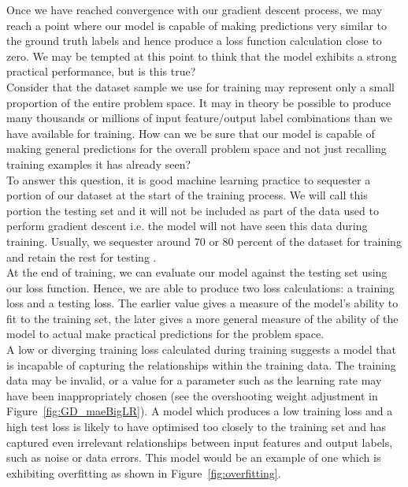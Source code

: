 \noindent
Once we have reached convergence with our gradient descent process, we may reach a point where our model is capable of making predictions very similar to the ground truth labels and hence produce a loss function calculation close to zero. We may be tempted at this point to think that the model exhibits a strong practical performance, but is this true? \\

\noindent
Consider that the dataset sample we use for training may represent only a small proportion of the entire problem space. It may in theory be possible to produce many thousands or millions of input feature/output label combinations than we have available for training. How can we be sure that our model is capable of making general predictions for the overall problem space and not just recalling training examples it has already seen? \\

\noindent
To answer this question, it is good machine learning practice to sequester a portion of our dataset at the start of the training process. We will call this portion the testing set and it will not be included as part of the data used to perform gradient descent i.e. the model will not have seen this data during training. Usually, we sequester around 70 or 80 percent of the dataset for training and retain the rest for testing \cite{gholamy201870}.\\

\noindent
At the end of training, we can evaluate our model against the testing set using our loss function. Hence, we are able to produce two loss calculations: a training loss and a testing loss. The earlier value gives a measure of the model's ability to fit to the training set, the later gives a more general measure of the ability of the model to actual make practical predictions for the problem space. \\

\noindent
A low or diverging training loss calculated during training suggests a model that is incapable of capturing the relationships within the training data. The training data may be invalid, or a value for a parameter such as the learning rate may have been inappropriately chosen (see the overshooting weight adjustment in Figure~\ref{fig:GD_maeBigLR}). A model which produces a low training loss and a high test loss is likely to have optimised too closely to the training set and has captured even irrelevant relationships between input features and output labels, such as noise or data errors. This model would be an example of one which is exhibiting overfitting \cite{ying2019overview} as shown in Figure~\ref{fig:overfitting}. \\

